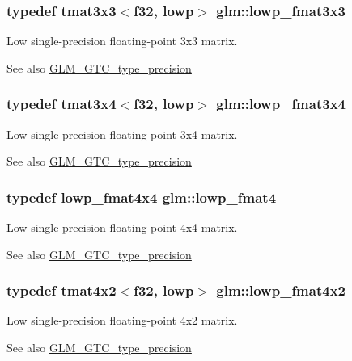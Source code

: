 \subsubsection[{lowp\+\_\+fmat3x3}]{\setlength{\rightskip}{0pt plus 5cm}typedef tmat3x3$<${\bf f32}, lowp$>$ {\bf glm\+::lowp\+\_\+fmat3x3}}\label{namespaceglm_a768d23520c7658624b9f212324ae8db0}
Low single-\/precision floating-\/point 3x3 matrix. \begin{DoxySeeAlso}{See also}
\hyperlink{group__gtc__type__precision}{G\+L\+M\+\_\+\+G\+T\+C\+\_\+type\+\_\+precision} 
\end{DoxySeeAlso}
\hypertarget{namespaceglm_a7d85ff21b93a179051735bc93ffa2a50}{}
\subsubsection[{lowp\+\_\+fmat3x4}]{\setlength{\rightskip}{0pt plus 5cm}typedef tmat3x4$<${\bf f32}, lowp$>$ {\bf glm\+::lowp\+\_\+fmat3x4}}\label{namespaceglm_a7d85ff21b93a179051735bc93ffa2a50}
Low single-\/precision floating-\/point 3x4 matrix. \begin{DoxySeeAlso}{See also}
\hyperlink{group__gtc__type__precision}{G\+L\+M\+\_\+\+G\+T\+C\+\_\+type\+\_\+precision} 
\end{DoxySeeAlso}
\hypertarget{namespaceglm_a00dfb85ec53bb5f173747f73d13c1b8b}{}
\subsubsection[{lowp\+\_\+fmat4}]{\setlength{\rightskip}{0pt plus 5cm}typedef {\bf lowp\+\_\+fmat4x4} {\bf glm\+::lowp\+\_\+fmat4}}\label{namespaceglm_a00dfb85ec53bb5f173747f73d13c1b8b}
Low single-\/precision floating-\/point 4x4 matrix. \begin{DoxySeeAlso}{See also}
\hyperlink{group__gtc__type__precision}{G\+L\+M\+\_\+\+G\+T\+C\+\_\+type\+\_\+precision} 
\end{DoxySeeAlso}
\hypertarget{namespaceglm_adc02280ed618235bb07dd06dd40aa547}{}
\subsubsection[{lowp\+\_\+fmat4x2}]{\setlength{\rightskip}{0pt plus 5cm}typedef tmat4x2$<${\bf f32}, lowp$>$ {\bf glm\+::lowp\+\_\+fmat4x2}}\label{namespaceglm_adc02280ed618235bb07dd06dd40aa547}
Low single-\/precision floating-\/point 4x2 matrix. \begin{DoxySeeAlso}{See also}
\hyperlink{group__gtc__type__precision}{G\+L\+M\+\_\+\+G\+T\+C\+\_\+type\+\_\+precision} 
\end{DoxySeeAlso}
\hypertarget{namespaceglm_a4a9685a8070dd173dd7d713e185a874c}{}
